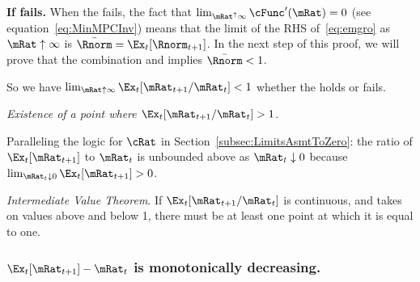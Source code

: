 \documentclass[\econtexRoot/BufferStockTheory]{subfiles}
\begin{document}
\textbf{If {\RIC} fails.}  When the {\RIC} fails, the fact that $\lim_{\mRat^{\uparrow} \infty} \cFunc^{\prime}(\mRat) = 0$ (see equation~\eqref{eq:MinMPCInv}) means that the limit of the RHS of~\eqref{eq:emgro} as $\mRat \uparrow \infty$ is $\bar{\Rnorm}=\Ex_{t}[\Rnorm_{t+1}]$.  In the next step of this proof, we will prove that the combination {\GICNrm} and \cncl{\RIC} implies $\bar{\Rnorm} < 1$.

So we have $\lim_{\mRat \uparrow \infty} \Ex_{t}[\mRat_{t+1}/\mRat_{t}] < 1$ whether the {\RIC} holds or fails.

\medskip\medskip

\noindent \textit{Existence of a point where \texorpdfstring{$\Ex_t [{\mRat}_{t+1}/\mRat_t] > 1$}{E[mRat-{t+1}/mRat-{t}] > 1}}.

Paralleling the logic for $\cRat$ in Section~\ref{subsec:LimitsAsmtToZero}: the ratio of $\Ex_{t}[\mRat_{t+1}]$ to $\mRat_{t}$ is unbounded above as $\mRat_{t} \downarrow 0$ because $\lim_{\mRat_{t}\downarrow 0} \Ex_{t}[\mRat_{t+1}] > 0$.

\medskip\medskip

\noindent \textit{Intermediate Value Theorem}.  If $\Ex_t [{\mRat}_{t+1}/\mRat_t]$ is continuous, and takes on values above and below 1, there must be at least one point at which it is equal to one.

\subsubsection{\texorpdfstring{$\Ex_t [{\mRat}_{t+1}] -\mRat_t$}{Delta m} is monotonically decreasing.}
\end{document}

